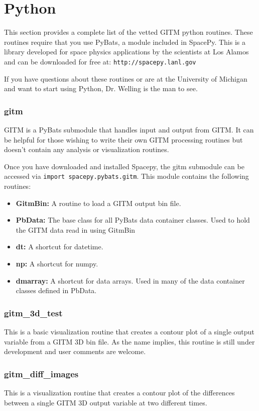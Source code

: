 \section{Python}
\label{python.sec}

This section provides a complete list of the vetted GITM python routines.  These routines require that you use PyBats, a module included in SpacePy.  This is a library developed for space physics applications by the scientists at Los Alamos and can be downloaded for free at: 
{\tt http://spacepy.lanl.gov}

If you have questions about these routines or are at the University of Michigan and want to start using Python, Dr. Welling is the man to see.

\subsubsection{gitm}

GITM is a PyBats submodule that handles input and output from GITM.  It can be helpful for those wishing to write their own GITM processing routines but doesn't contain any analysis or visualization routines. 

Once you have downloaded and installed Spacepy, the gitm submodule can be accessed via {\tt import spacepy.pybats.gitm}.  This module contains the following routines:

\begin{itemize}
\item[]{\bf GitmBin: } A routine to load a GITM output bin file.
\item[]{\bf PbData: } The base class for all PyBats data container classes.  Used to hold the GITM data read in using GitmBin
\item[]{\bf dt: } A shortcut for datetime.
\item[]{\bf np: } A shortcut for numpy.
\item[]{\bf dmarray: } A shortcut for data arrays.  Used in many of the data container classes defined in PbData.
\end{itemize}

\subsubsection{gitm\_3d\_test}

This is a basic visualization routine that creates a contour plot of a single output variable from a GITM 3D bin file.  As the name implies, this routine is still under development and user comments are welcome.

\subsubsection{gitm\_diff\_images}

This is a visualization routine that creates a contour plot of the differences between a single GITM 3D output variable at two different times.

